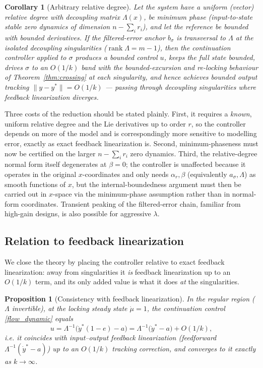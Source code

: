 \documentclass[11pt,american]{article}
\DeclareMathOperator{\rank}{\operatorname{rank}}
\newtheorem{proposition}{Proposition}
\theoremstyle{definition}
\theoremstyle{plain}
\newtheorem{corollary}{Corollary}
\theoremstyle{remark}
\begin{document}
\begin{corollary}[Arbitrary relative degree]\label{cor:rdr}
Let the system have a uniform (vector) relative degree with decoupling matrix $\Lambda(x)$, be minimum phase (input-to-state stable zero dynamics of dimension $n - \sum_i r_i$), and let the reference be bounded with bounded derivatives. If the filtered-error anchor $b_\sigma$ is transversal to $\Lambda$ at the isolated decoupling singularities ($\rank\Lambda = m-1$), then the continuation controller applied to $\sigma$ produces a bounded control $u$, keeps the full state bounded, drives $\sigma$ to an $O(1/k)$ band with the bounded-excursion and re-locking behaviour of Theorem~\ref{thm:crossing} at each singularity, and hence achieves bounded output tracking $\|y - y^*\| = O(1/k)$ --- passing through decoupling singularities where feedback linearization diverges.
\end{corollary}

Three costs of the reduction should be stated plainly. First, it requires a \emph{known}, uniform relative degree and the Lie derivatives up to order $r$, so the controller depends on more of the model and is correspondingly more sensitive to modelling error, exactly as exact feedback linearization is. Second, minimum-phaseness must now be certified on the larger $n - \sum_i r_i$ zero dynamics. Third, the relative-degree normal form itself degenerates at $\beta = 0$; the controller is unaffected because it operates in the original $x$-coordinates and only needs $\alpha_r, \beta$ (equivalently $a_\sigma, \Lambda$) as smooth functions of $x$, but the internal-boundedness argument must then be carried out in $x$-space via the minimum-phase assumption rather than in normal-form coordinates. Transient peaking of the filtered-error chain, familiar from high-gain designs, is also possible for aggressive $\lambda$.

\subsection{Relation to feedback linearization}\label{sec:fl}

We close the theory by placing the controller relative to exact feedback linearization: away from singularities it \emph{is} feedback linearization up to an $O(1/k)$ term, and its only added value is what it does \emph{at} the singularities.

\begin{proposition}[Consistency with feedback linearization]\label{prop:consistency}
In the regular region ($\Lambda$ invertible), at the locking steady state $\dot\mu = 1$, the continuation control \eqref{flow_dynamic} equals
\begin{equation}\label{u_reduction}
u = \Lambda^{-1}\bigl(\dot y^*(1-e) - a\bigr) = \Lambda^{-1}\bigl(\dot y^* - a\bigr) + O(1/k),
\end{equation}
i.e. it coincides with input--output feedback linearization (feedforward $\Lambda^{-1}(\dot y^* - a)$) up to an $O(1/k)$ tracking correction, and converges to it exactly as $k \to \infty$.
\end{proposition}
\end{document}
